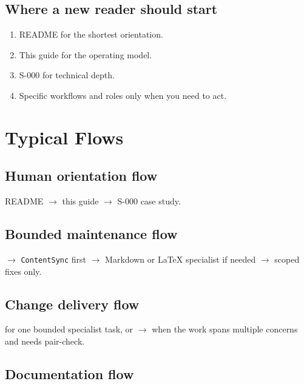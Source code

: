 \documentclass[a4paper,11pt,openany]{report}
\begin{document}
\section{Where a new reader should start}

\begin{enumerate}
  \item README for the shortest orientation.
  \item This guide for the operating model.
  \item S-000 for technical depth.
  \item Specific workflows and roles only when you need to act.
\end{enumerate}


\chapter{Typical Flows}


\section{Human orientation flow}

README $\rightarrow$ this guide $\rightarrow$ S-000 case study.

\section{Bounded maintenance flow}

 $\rightarrow$ \texttt{ContentSync} first
$\rightarrow$ Markdown or LaTeX specialist if needed
$\rightarrow$ scoped fixes only.

\section{Change delivery flow}

 for one bounded specialist task, or
 $\rightarrow$  when the work spans multiple
concerns and needs pair-check.

\section{Documentation flow}
\end{document}
